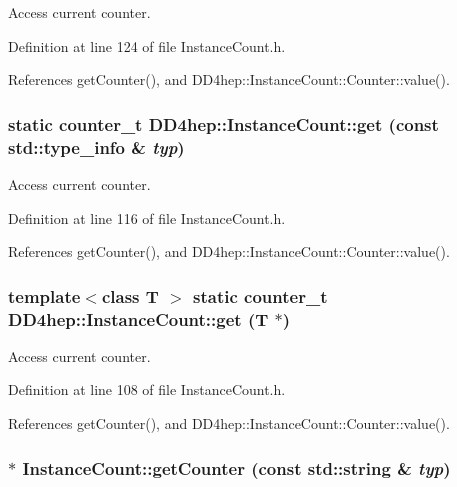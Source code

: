 Access current counter. 

Definition at line 124 of file InstanceCount.h.

References getCounter(), and DD4hep::InstanceCount::Counter::value().\hypertarget{struct_d_d4hep_1_1_instance_count_a1b6de9faa3cda69498c13c07ea0f289c}{
\subsubsection[{get}]{\setlength{\rightskip}{0pt plus 5cm}static {\bf counter\_\-t} DD4hep::InstanceCount::get (const std::type\_\-info \& {\em typ})}}
\label{struct_d_d4hep_1_1_instance_count_a1b6de9faa3cda69498c13c07ea0f289c}


Access current counter. 

Definition at line 116 of file InstanceCount.h.

References getCounter(), and DD4hep::InstanceCount::Counter::value().\hypertarget{struct_d_d4hep_1_1_instance_count_afe779df8d58ccb3292c1011b869608bd}{
\subsubsection[{get}]{\setlength{\rightskip}{0pt plus 5cm}template$<$class T $>$ static {\bf counter\_\-t} DD4hep::InstanceCount::get ({\bf T} $\ast$)}}
\label{struct_d_d4hep_1_1_instance_count_afe779df8d58ccb3292c1011b869608bd}


Access current counter. 

Definition at line 108 of file InstanceCount.h.

References getCounter(), and DD4hep::InstanceCount::Counter::value().\hypertarget{struct_d_d4hep_1_1_instance_count_ace5ceb5f2e95cb4c2a48cbd9edc3e84c}{
\subsubsection[{getCounter}]{ $\ast$ InstanceCount::getCounter (const std::string \& {\em typ})}}
\label{struct_d_d4hep_1_1_instance_count_ace5ceb5f2e95cb4c2a48cbd9edc3e84c}


